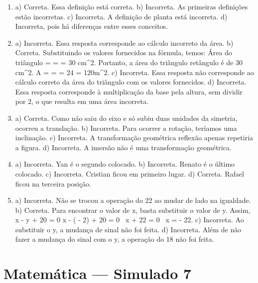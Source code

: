\begin{enumerate}
\item a) Correta. Essa definição está correta.
b) Incorreta. As primeiras definições estão incorretas.
c) Incorreta. A definição de planta está incorreta.
d) Incorreta, pois há diferenças entre esses conceitos.


\item a) Incorreta. Essa resposta corresponde ao cálculo incorreto da área.
b) Correta. Substituindo os valores fornecidos na fórmula, temos:
Área do triângulo =  =  =
30 \;cm^2. Portanto, a área do triângulo retângulo é de 30 cm^2.
A =  =  = 24  = 120m^2.
c) Incorreta. Essa resposta não corresponde ao cálculo correto da área do triângulo com os valores fornecidos.
d) Incorreta. Essa resposta corresponde à multiplicação da base pela altura, sem dividir por 2, o que resulta em uma área incorreta.

\item a) Correta. Como não saiu do eixo e só subiu duas unidades da simetria, ocorreu a translação.
b) Incorreta. Para ocorrer a rotação, teríamos uma inclinação.
c) Incorreta. A transformação geométrica reflexão apenas repetiria a figura.
d) Incorreta. A imersão não é uma transformação geométrica.

\item a) Incorreta. Yan é o segundo colocado.
b) Incorreta. Renato é o último colocado.
c) Incorreta. Cristian ficou em primeiro lugar.
d) Correta. Rafael ficou na terceira posição.


\item a) Incorreta. Não se trocou a operação do 22 ao mudar de lado na igualdade.
b) Correta. Para encontrar o valor de x, basta substituir o valor
de y. Assim, x - y + 20 = 0 \rightarrow x - ( - 2) + 20 = 0 \rightarrow \ x + 22 = 0 \rightarrow \ x = - 22.
c) Incorreta. Ao substituir o y, a mudança de sinal não foi feita.
d) Incorreta. Além de não fazer a mudança do sinal com o y, a operação do 18 não foi feita.
\end{enumerate}

\section*{Matemática — Simulado 7} 

